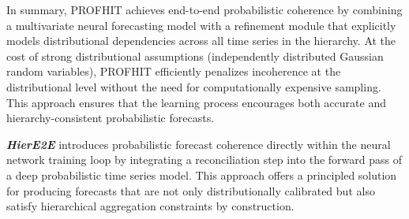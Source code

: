 \documentclass[letterpaper]{article}
\begin{document}
In summary, PROFHIT achieves end-to-end probabilistic coherence by combining a multivariate neural forecasting model with a refinement module that explicitly models distributional dependencies across all time series in the hierarchy.
At the cost of strong distributional assumptions (independently distributed Gaussian random variables), PROFHIT efficiently penalizes incoherence at the distributional level without the need for computationally expensive sampling. 
This approach ensures that the learning process encourages both accurate and hierarchy-consistent probabilistic forecasts.

\textit{\textbf{HierE2E}} introduces probabilistic forecast coherence directly within the neural network training loop by integrating a reconciliation step into the forward pass of a deep probabilistic time series model. 
This approach offers a principled solution for producing forecasts that are not only distributionally calibrated but also satisfy hierarchical aggregation constraints by construction.
\end{document}
